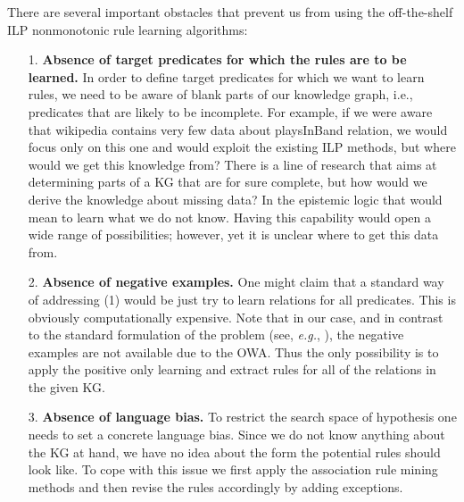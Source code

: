 There are several important obstacles that prevent us from using the off-the-shelf ILP nonmonotonic rule learning algorithms:
\begin{itemize}
\item[1.] \textbf{Absence of target predicates for which the rules are to be learned.} In order to define target predicates for which we want to learn rules, we need to be aware of blank parts of our knowledge graph, i.e., predicates that are likely to be incomplete. For example, if we were aware that wikipedia contains very few data about playsInBand relation, we would focus only on this one and would exploit the existing ILP methods, but where would we get this knowledge from? There is a line of research that aims at determining parts of  a KG that are for sure complete, but how would we derive the knowledge about missing data? In the epistemic logic that would mean to learn what we do not know. Having this capability would open a wide range of possibilities; however, yet it is unclear where to get this data from.
%
%
\item[2.] \textbf{Absence of negative examples.} One might claim that a standard way of addressing (1) would be just try to learn relations for all predicates. This is obviously computationally expensive. Note that in our case, and in contrast to the standard formulation of the problem (see, \textit{e.g.}, \cite{wr1996}), the negative examples are not available due to the OWA. Thus the only possibility is to apply the positive only learning and extract rules for all of the relations in the given KG.
\item[3.] \textbf{Absence of language bias.} To restrict the search space of hypothesis one needs to set a concrete language bias. Since we do not know anything about the KG at hand, we have no idea about the form the potential rules should look like. To cope with this issue we first apply the association rule mining methods and then revise the rules accordingly by adding exceptions.
\end{itemize}

